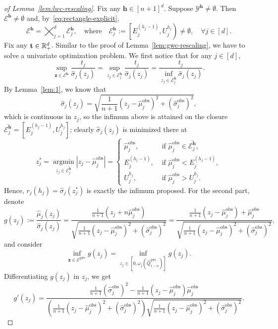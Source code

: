 \begin{proof}[of Lemma~\ref{lem:lwc-rescaling}]
Fix any $\mathbf{h} \in [n+1]^d$.
Suppose $\mathcal{Y}^{\mathbf{h}} \neq \emptyset$. Then $\mathcal{E}^{\mathbf{h}} \neq \emptyset$ and,
by~\eqref{eq:rectangle-explicit},
\[
\mathcal{E}^{\mathbf{h}} = \bigtimes_{j=1}^{d} \mathcal{E}^{\mathbf{h}}_j,
\quad\text{where}\quad
\mathcal{E}^{\mathbf{h}}_j :=\left[E^{(h_j-1)}_j, U^{h_j}_j\right) \neq \emptyset, \quad \forall j \in [d].
\]
Fix any $\mathbf t \in \mathbb{R}^d_+$. Similar to the proof of Lemma~\ref{lem:gwc-rescaling}, we have to solve a univariate optimization problem. We first notice that for any $j \in [d]$,
\[
\sup_{\mathbf z \in \mathcal{E}^{\mathbf{h}}} \frac{t_j}{\hat{\sigma}_{j}(z_j)}= \sup_{z_j \in \mathcal{E}^{\mathbf{h}}_j} \frac{t_j}{\hat{\sigma}_{j}(z_j)} = \frac{t_j}{\inf_{z_j \in \mathcal{E}^{\mathbf{h}}_j}\hat{\sigma}_{j}(z_j)}.
\]
By Lemma~\ref{lem:1}, we know that
\[
\hat{\sigma}_{j}(z_j) = \sqrt{\frac{1}{n+1}(z_j - \hat{\mu}^\mathrm{obs}_j)^2 + (\hat{\sigma}^\mathrm{obs}_j)^2},
\]
which is continuous in $z_j$, so the infimum above is attained on the closure $\overline{\mathcal{E}^{\mathbf{h}}_j} = \left[E^{(h_j-1)}_j, U^{h_j}_j\right]$; clearly $\hat{\sigma}_{j}(z_j)$ is minimized there at
\[
z^*_j = \operatorname*{argmin}_{z_j \in \overline{\mathcal{E}^{\mathbf{h}}_j}}|z_j-\hat{\mu}^\mathrm{obs}_j| = \begin{cases}
    \hat{\mu}^\mathrm{obs}_j, &\text{ if }\hat{\mu}^\mathrm{obs}_j \in \overline{\mathcal{E}^{\mathbf{h}}_j},\\
    E^{(h_j-1)}_j, &\text{ if } \hat{\mu}^\mathrm{obs}_j< E^{(h_j-1)}_j,\\
    U^{h_j}_j, &\text{ if }\hat{\mu}^\mathrm{obs}_j >  U^{h_j}_j.
\end{cases}
\]
Hence, $r_j(h_j) = \hat{\sigma}_{j}(z^*_j)$ is exactly the infimum proposed. 
\noindent
For the second part, denote
\[
g(z_j):=\frac{\hat{\mu}_{j}(z_j)}{\hat{\sigma}_{j}(z_j)} 
= \frac{\tfrac{1}{n+1}(z_j+n\hat{\mu}^\mathrm{obs}_j)}{\sqrt{\tfrac{1}{n+1}(z_j-\hat{\mu}^\mathrm{obs}_j)^2+(\hat{\sigma}^\mathrm{obs}_j)^2}}=\frac{\tfrac{1}{n+1}(z_j-\hat{\mu}^\mathrm{obs}_j)+\hat{\mu}^\mathrm{obs}_j}{\sqrt{\tfrac{1}{n+1}(z_j-\hat{\mu}^\mathrm{obs}_j)^2+(\hat{\sigma}^\mathrm{obs}_j)^2}},
\]
and consider
\[
\inf_{\mathbf z \in \mathcal{E}^{\mathrm{gwc}}}g(z_j) = \inf_{z_j \in [0, \omega_j(\hat{Q}^{\mathrm{gwc}}_{1-\alpha})]}g(z_j).
\]
Differentiating $g(z_j)$ in $z_j$, we get
\[
g'(z_j) = \frac{\frac{1}{n+1}(\hat{\sigma}^\mathrm{obs}_j)^2-\frac{1}{n+1}(z_j-\hat{\mu}^\mathrm{obs}_j)\hat{\mu}^\mathrm{obs}_j}{(\tfrac{1}{n+1}(z_j-\hat{\mu}^\mathrm{obs}_j)^2+(\hat{\sigma}^\mathrm{obs}_j)^2)\sqrt{\tfrac{1}{n+1}(z_j-\hat{\mu}^\mathrm{obs}_j)^2+(\hat{\sigma}^\mathrm{obs}_j)^2}}.
\]
\end{proof}
